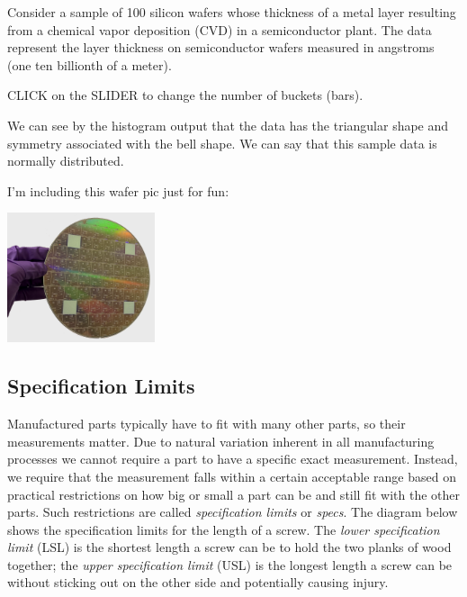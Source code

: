 \documentclass{ximera}
\begin{document}
\begin{exploration}\label{exp:histogram1}
Consider a sample of 100 silicon wafers whose thickness of a metal layer resulting from a chemical vapor deposition (CVD) in a semiconductor plant. The data represent the layer thickness on semiconductor wafers measured in angstroms (one ten billionth of a meter).


CLICK on the SLIDER to change the number of buckets (bars).

\begin{onlineOnly}
\begin{center} 
\end{center}
\end{onlineOnly}

We can see by the histogram output that the data has the triangular shape and symmetry associated with the bell shape. We can say that this sample data is normally distributed.

I'm including this wafer pic just for fun:

\begin{image}
         \includegraphics[height=1.5in]{200mmWafer.png}
\end{image}
\end{exploration}

\subsection*{Specification Limits}
Manufactured parts typically have to fit with many other parts, so their measurements matter. Due to natural variation inherent in all manufacturing processes we cannot require a part to have a specific exact measurement.  Instead, we require that the measurement falls within a certain acceptable range based on practical restrictions on how big or small a part can be and still fit with the other parts.  Such restrictions are called \emph{specification limits} or \emph{specs}.  The diagram below shows the specification limits for the length of a screw.  The \emph{lower specification limit} (LSL) is the shortest length a screw can be to hold the two planks of wood together; the \emph{upper specification limit} (USL) is the longest length a screw can be without sticking out on the other side and potentially causing injury.
\end{document}
